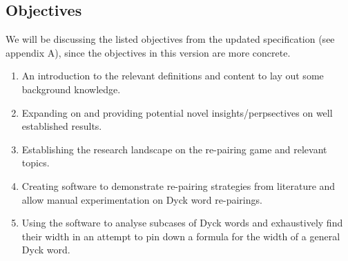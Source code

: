 \documentclass[a4paper]{article}
\begin{document}
	\subsection{Objectives}
	We will be discussing the listed objectives from the updated specification (see appendix A), since the objectives in this version are more concrete.
	\begin{enumerate}
		\item An introduction to the relevant definitions and content to lay out some background knowledge.
		\item Expanding on and providing potential novel insights/perpsectives on well established results.
		\item Establishing the research landscape on the re-pairing game and relevant topics.
		\item Creating software to demonstrate re-pairing strategies from literature and allow manual experimentation on Dyck word re-pairings.
		\item Using the software to analyse subcases of Dyck words and exhaustively find their width in an attempt to pin down a formula for the width of a general Dyck word.
	\end{enumerate}
\end{document}
